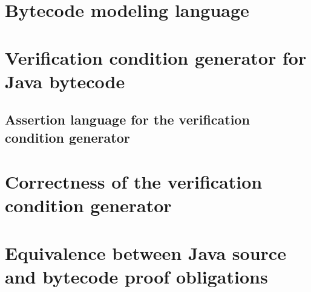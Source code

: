 \documentclass[10pt,a4paper]{book}
\begin{document}
\chapter{Bytecode modeling language} \label{bcsl}
  \lstset{numbers=left,numberstyle=\small,stepnumber=1,numbersep=5pt}
   
  
  
  
  
  




\chapter{Verification condition generator for Java bytecode } \label{wpGeneral}
  

\section{Assertion language for the verification condition generator}\label{assertLang}
  \label{assertLang}
  
  
   
   
  
   
  
  
  
   
  

\chapter{Correctness of the verification condition generator}\label{proofGeneral}
  
   
  
  
  
  



\chapter{Equivalence between Java source and bytecode proof obligations}\label{pogEquiv}
  
 
 
   
	 
\end{document}
